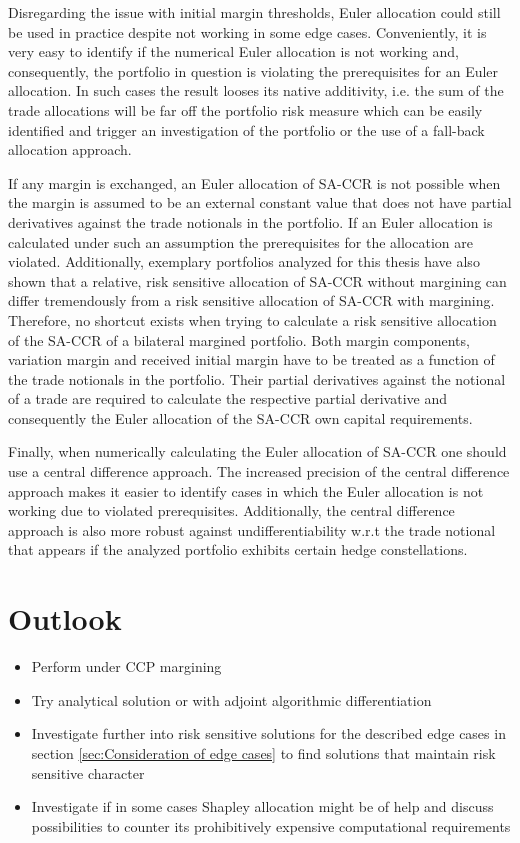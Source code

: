 \documentclass[../Thesis_AHoecherl.tex]{subfiles}
\begin{document}
Disregarding the issue with initial margin thresholds, Euler allocation could still be used in practice despite not working in some edge cases. 
Conveniently, it is very easy to identify if the numerical Euler allocation is not working and, consequently, the portfolio in question is violating the prerequisites for an Euler allocation.
In such cases the result looses its native additivity, i.e. the sum of the trade allocations will be far off the portfolio risk measure which can be easily identified and trigger an investigation of the portfolio or the use of a fall-back allocation approach.

If any margin is exchanged, an Euler allocation of \gls{SA-CCR} is not possible when the margin is assumed to be an external constant value that does not have partial derivatives against the trade notionals in the portfolio.
If an Euler allocation is calculated under such an assumption the prerequisites for the allocation are violated. Additionally, exemplary portfolios analyzed for this thesis have also shown that a relative, risk sensitive allocation of \gls{SA-CCR} without margining can differ tremendously from a risk sensitive allocation of \gls{SA-CCR} with margining.
Therefore, no shortcut exists when trying to calculate a risk sensitive allocation of the \gls{SA-CCR} of a bilateral margined portfolio. 
Both margin components, variation margin and received initial margin have to be treated as a function of the trade notionals in the portfolio. Their partial derivatives against the notional of a trade are required to calculate the respective partial derivative and consequently the Euler allocation of the \gls{SA-CCR} own capital requirements.

Finally, when numerically calculating the Euler allocation of \gls{SA-CCR} one should use a central difference approach. The increased precision of the central difference approach makes it easier to identify cases in which the Euler allocation is not working due to violated prerequisites. Additionally, the central difference approach is also more robust against undifferentiability w.r.t the trade notional that appears if the analyzed portfolio exhibits certain hedge constellations.

\section{Outlook\label{sec:Outlook}}



\begin{itemize}
    \item Perform under CCP margining
    \item Try analytical solution or with adjoint algorithmic differentiation
    \item Investigate further into risk sensitive solutions for the described edge cases in section \ref{sec:Consideration of edge cases} to find solutions that maintain risk sensitive character
    \item Investigate if in some cases Shapley allocation might be of help and discuss possibilities to counter its prohibitively expensive computational requirements
\end{itemize}
\end{document}
